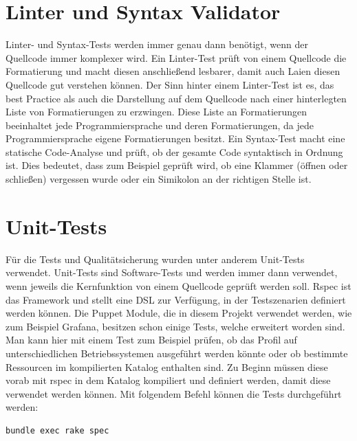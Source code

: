 \section{Linter und Syntax Validator}
Linter- und Syntax\hyp{}Tests werden immer genau dann benötigt, wenn der
Quellcode immer komplexer wird. Ein Linter\hyp{}Test prüft von einem Quellcode
die Formatierung und macht diesen anschließend lesbarer, damit auch Laien
diesen Quellcode gut verstehen können. Der Sinn hinter einem Linter\hyp{}Test
ist es, das best Practice als auch die Darstellung auf dem Quellcode nach einer
hinterlegten Liste von Formatierungen zu erzwingen. Diese Liste an
Formatierungen beeinhaltet jede Programmiersprache und deren Formatierungen, da
jede Programmiersprache eigene Formatierungen besitzt. Ein Syntax\hyp{}Test
macht eine statische Code\hyp{}Analyse und prüft, ob der gesamte Code
syntaktisch in Ordnung ist. Dies bedeutet, dass zum Beispiel geprüft wird, ob
eine Klammer (öffnen oder schließen) vergessen wurde oder ein Simikolon an der
richtigen Stelle ist.
\mr%

\section{Unit-Tests}
\label{sec:unit_tests}
Für die Tests und Qualitätsicherung wurden unter anderem Unit\hyp{}Tests
verwendet.  Unit\hyp{}Tests sind Software\hyp{}Tests und werden immer dann
verwendet, wenn jeweils die Kernfunktion von einem Quellcode geprüft werden
soll. Rspec ist das Framework und stellt eine \gls{DSL} zur Verfügung, in der
Testszenarien definiert werden können. Die Puppet Module, die in diesem Projekt
verwendet werden, wie zum Beispiel Grafana, besitzen schon einige Tests, welche
erweitert worden sind. Man kann hier mit einem Test zum Beispiel prüfen, ob das
Profil auf unterschiedlichen Betriebssystemen ausgeführt werden könnte oder ob
bestimmte Ressourcen im kompilierten Katalog enthalten sind. Zu Beginn müssen
diese vorab mit rspec in dem Katalog kompiliert und definiert werden, damit
diese verwendet werden können. Mit folgendem Befehl können die Tests
durchgeführt werden:

\begin{verbatim}
bundle exec rake spec
\end{verbatim}

